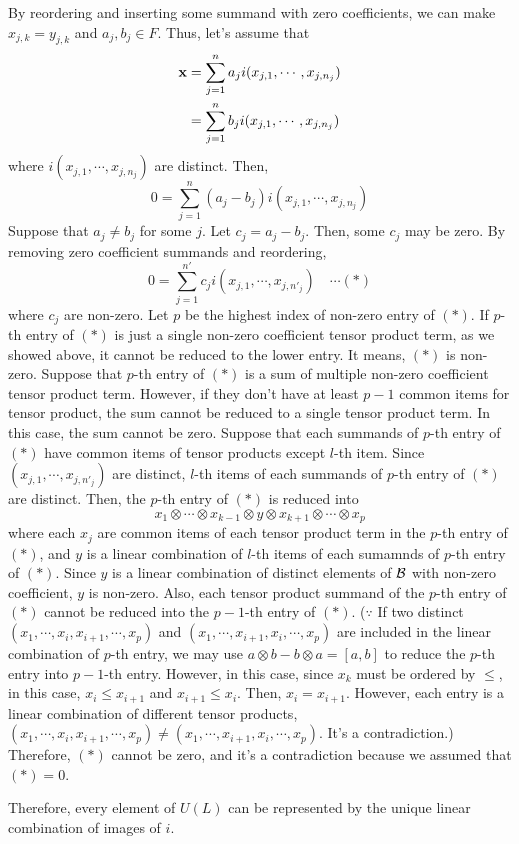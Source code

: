 By reordering and inserting some summand with zero coefficients,
we can make \(x_{j,k} = y_{j,k}\) and \(a_j, b_j \in F\).
Thus, let's assume that
\begin{align*}
  \mathbf{x}
  &= \sum_{j=1}^n a_j i(x_{j,1},\cdots,x_{j,n_j})
  \\&= \sum_{j=1}^n b_j i(x_{j,1},\cdots,x_{j,n_j})
\end{align*}
where \(i(x_{j,1},\cdots,x_{j,n_j})\) are distinct.
Then,
\[0 = \sum_{j=1}^n (a_j - b_j) i(x_{j,1},\cdots,x_{j,n_j})\]
Suppose that \(a_j \neq b_j\) for some \(j\).
Let \(c_j = a_j - b_j\).
Then, some \(c_j\) may be zero.
By removing zero coefficient summands and reordering,
\[0 = \sum_{j=1}^{n'} c_j i(x_{j,1},\cdots,x_{j,n'_j}) \quad\cdots(*)\]
where \(c_j\) are non-zero.
Let \(p\) be the highest index of non-zero entry of \((*)\).
If \(p\)-th entry of \((*)\) is just a single non-zero coefficient tensor product term,
as we showed above,
it cannot be reduced to the lower entry.
It means, \((*)\) is non-zero.
Suppose that \(p\)-th entry of \((*)\) is a sum of multiple non-zero coefficient tensor product term.
However, if they don't have at least \(p - 1\) common items for tensor product, the sum cannot be reduced to a single tensor product term.
In this case, the sum cannot be zero.
Suppose that each summands of \(p\)-th entry of \((*)\) have
common items of tensor products except \(l\)-th item.
Since \((x_{j,1},\cdots,x_{j,n'_j})\) are distinct,
\(l\)-th items of each summands of \(p\)-th entry of \((*)\) are distinct.
Then, the \(p\)-th entry of \((*)\) is reduced into
\[x_1 \otimes \cdots \otimes x_{k-1} \otimes y \otimes x_{k+1} \otimes \cdots \otimes x_p\]
where each \(x_j\) are common items of each tensor product term in the \(p\)-th entry of \((*)\), and \(y\) is a linear combination of \(l\)-th items of each sumamnds of \(p\)-th entry of \((*)\).
Since \(y\) is a linear combination of distinct elements of \(\mathcal{B}\) with non-zero coefficient, \(y\) is non-zero.
Also, each tensor product summand of the \(p\)-th entry of \((*)\)
cannot be reduced into the \(p - 1\)-th entry of \((*)\).
(\(\because\)
 If two distinct \((x_1, \cdots, x_i, x_{i+1}, \cdots, x_p)\)
 and \((x_1, \cdots, x_{i+1}, x_i, \cdots, x_p)\)
 are included in the linear combination of \(p\)-th entry,
 we may use \(a \otimes b - b \otimes a = [a, b]\)
 to reduce the \(p\)-th entry into \(p-1\)-th entry.
 However, in this case,
 since \(x_k\) must be ordered by \(\le\),
 in this case,
 \(x_i \le x_{i+1}\) and \(x_{i+1} \le x_i\).
 Then,
 \(x_i = x_{i+1}\).
 However, each entry is a linear combination of different tensor products,
 \((x_1, \cdots, x_i, x_{i+1}, \cdots, x_p) \neq (x_1, \cdots, x_{i+1}, x_i, \cdots, x_p)\).
 It's a contradiction.)
Therefore, \((*)\) cannot be zero,
and it's a contradiction because we assumed that \((*) = 0\).

Therefore, every element of \(U(L)\) can be represented
by the unique linear combination of images of \(i\).
\qedsq